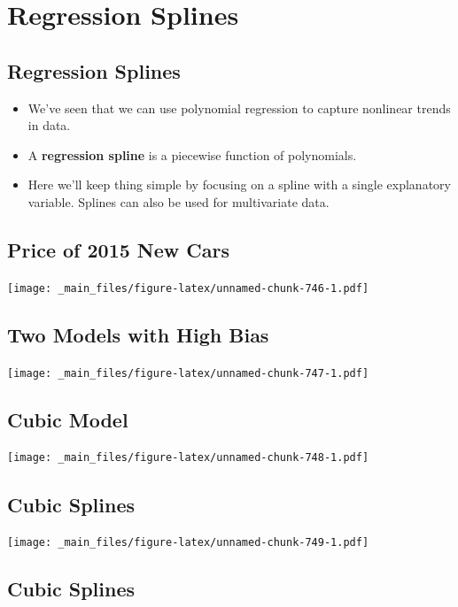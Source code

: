 \documentclass[]{book}
\begin{document}
\section{Regression Splines}\label{regression-splines}

\subsection{Regression Splines}\label{regression-splines-1}

\begin{itemize}
\item
  We've seen that we can use polynomial regression to capture nonlinear
  trends in data.
\item
  A \textbf{regression spline} is a piecewise function of polynomials.
\item
  Here we'll keep thing simple by focusing on a spline with a single
  explanatory variable. Splines can also be used for multivariate data.
\end{itemize}

\subsection{Price of 2015 New Cars}\label{price-of-2015-new-cars}

\texttt{[image: \_main\_files/figure-latex/unnamed-chunk-746-1.pdf]}

\subsection{Two Models with High Bias}\label{two-models-with-high-bias}

\texttt{[image: \_main\_files/figure-latex/unnamed-chunk-747-1.pdf]}

\subsection{Cubic Model}\label{cubic-model-2}

\texttt{[image: \_main\_files/figure-latex/unnamed-chunk-748-1.pdf]}

\subsection{Cubic Splines}\label{cubic-splines}

\texttt{[image: \_main\_files/figure-latex/unnamed-chunk-749-1.pdf]}

\subsection{Cubic Splines}\label{cubic-splines-1}
\end{document}
